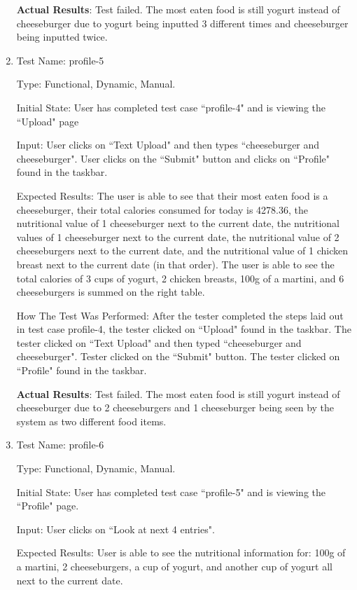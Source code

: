 \documentclass[12pt, titlepage]{article}
\begin{document}
\begin{enumerate}
		\textbf{Actual Results}: Test failed. The most eaten food is still yogurt instead of cheeseburger due to yogurt being inputted 3 different times and cheeseburger being inputted twice.
		
		\item{Test Name: profile-5}
		
		Type: Functional, Dynamic, Manual.
		
		Initial State: User has completed test case ``profile-4" and is viewing the ``Upload" page
		
		Input: User clicks on ``Text Upload" and then types ``cheeseburger and cheeseburger". User clicks on the ``Submit" button and clicks on ``Profile" found in the taskbar.
		
		Expected Results: The user is able to see that their most eaten food is a cheeseburger, their total calories consumed for today is 4278.36, the nutritional value of 1 cheeseburger next to the current date, the nutritional values of 1 cheeseburger next to the current date, the nutritional value of 2 cheeseburgers next to the current date, and the nutritional value of 1 chicken breast next to the current date (in that order). The user is able to see the total calories of 3 cups of yogurt, 2 chicken breasts, 100g of a martini, and 6 cheeseburgers is summed on the right table.
		
		How The Test Was Performed: After the tester completed the steps laid out in test case profile-4, the tester clicked on ``Upload" found in the taskbar. The tester clicked on ``Text Upload" and then typed ``cheeseburger and cheeseburger". Tester clicked on the ``Submit" button. The tester clicked on ``Profile" found in the taskbar.
		
		\textbf{Actual Results}: Test failed. The most eaten food is still yogurt instead of cheeseburger due to 2 cheeseburgers and 1 cheeseburger being seen by the system as two different food items.
		
		\item{Test Name: profile-6}
		
		Type: Functional, Dynamic, Manual.
		
		Initial State: User has completed test case ``profile-5" and is viewing the ``Profile" page.
		
		Input: User clicks on ``Look at next 4 entries".
		
		Expected Results: User is able to see the nutritional information for: 100g of a martini, 2 cheeseburgers, a cup of yogurt, and another cup of yogurt all next to the current date.
		

\end{enumerate}
\end{document}

